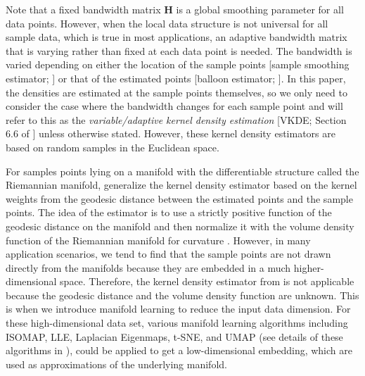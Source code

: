 \documentclass[11pt,a4paper,]{article}
\begin{document}
Note that a fixed bandwidth matrix \(\pmb{H}\) is a global smoothing parameter for all data points. However, when the local data structure is not universal for all sample data, which is true in most applications, an adaptive bandwidth matrix that is varying rather than fixed at each data point is needed.
The bandwidth is varied depending on either the location of the sample points {[}sample smoothing estimator; \textcite{Terrell1992-ut}{]} or that of the estimated points {[}balloon estimator; \textcite{Terrell1992-ut}{]}. In this paper, the densities are estimated at the sample points themselves, so we only need to consider the case where the bandwidth changes for each sample point and will refer to this as the \emph{variable/adaptive kernel density estimation} {[}VKDE; Section 6.6 of \textcite{Scott2015-vl}{]} unless otherwise stated.
However, these kernel density estimators are based on random samples in the Euclidean space.

For samples points lying on a manifold with the differentiable structure called the Riemannian manifold, \textcite{Pelletier2005-vu} generalize the kernel density estimator based on the kernel weights from the geodesic distance between the estimated points and the sample points. The idea of the estimator is to use a strictly positive function of the geodesic distance on the manifold and then normalize it with the volume density function of the Riemannian manifold for curvature \autocite{Henry2009-ll}.
However, in many application scenarios, we tend to find that the sample points are not drawn directly from the manifolds because they are embedded in a much higher-dimensional space. Therefore, the kernel density estimator from \textcite{Pelletier2005-vu} is not applicable because the geodesic distance and the volume density function are unknown.
This is when we introduce manifold learning to reduce the input data dimension. For these high-dimensional data set, various manifold learning algorithms including ISOMAP, LLE, Laplacian Eigenmaps, t-SNE, and UMAP (see details of these algorithms in \textcite{Cheng2021-ex}), could be applied to get a low-dimensional embedding, which are used as approximations of the underlying manifold.
\end{document}
